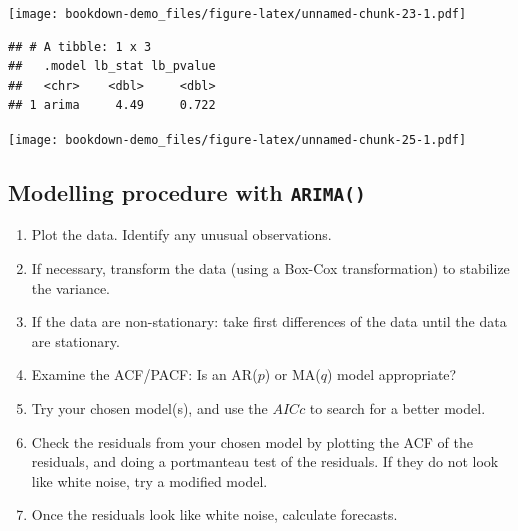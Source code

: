 \documentclass[]{book}
\newenvironment{Shaded}{\begin{snugshade}}{\end{snugshade}}
\newcommand{\DataTypeTok}[1]{\textcolor[rgb]{0.13,0.29,0.53}{#1}}
\newcommand{\DecValTok}[1]{\textcolor[rgb]{0.00,0.00,0.81}{#1}}
\newcommand{\KeywordTok}[1]{\textcolor[rgb]{0.13,0.29,0.53}{\textbf{#1}}}
\newcommand{\NormalTok}[1]{#1}
\newcommand{\OperatorTok}[1]{\textcolor[rgb]{0.81,0.36,0.00}{\textbf{#1}}}
\newcommand{\StringTok}[1]{\textcolor[rgb]{0.31,0.60,0.02}{#1}}
\providecommand{\tightlist}{%
  \setlength{\itemsep}{0pt}\setlength{\parskip}{0pt}}
\begin{document}
\texttt{[image: bookdown-demo\_files/figure-latex/unnamed-chunk-23-1.pdf]}

\begin{Shaded}
\end{Shaded}

\begin{verbatim}
## # A tibble: 1 x 3
##   .model lb_stat lb_pvalue
##   <chr>    <dbl>     <dbl>
## 1 arima     4.49     0.722
\end{verbatim}

\begin{Shaded}
\end{Shaded}

\texttt{[image: bookdown-demo\_files/figure-latex/unnamed-chunk-25-1.pdf]}

\newpage

\hypertarget{modelling-procedure-with-arima}{%
\subsection{\texorpdfstring{Modelling procedure with \texttt{ARIMA()}}{Modelling procedure with ARIMA()}}\label{modelling-procedure-with-arima}}

\begin{enumerate}
\def\labelenumi{\arabic{enumi}.}
\tightlist
\item
  Plot the data. Identify any unusual observations.
\item
  If necessary, transform the data (using a Box-Cox transformation) to stabilize the variance.
\item
  If the data are non-stationary: take first differences of the data until the data are stationary.
\item
  Examine the ACF/PACF: Is an AR(\(p\)) or MA(\(q\)) model appropriate?
\item
  Try your chosen model(s), and use the \(AICc\) to search for a better model.
\item
  Check the residuals from your chosen model by plotting the ACF of the residuals, and doing a portmanteau test of the residuals. If they do not look like white noise, try a modified model.
\item
  Once the residuals look like white noise, calculate forecasts.
\end{enumerate}
\end{document}
